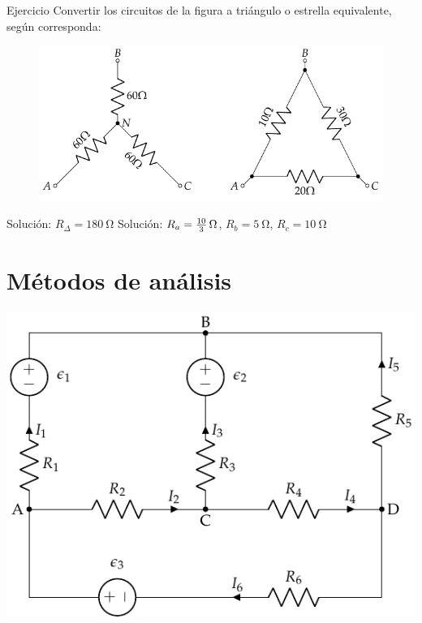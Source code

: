 \documentclass[aspectratio=169, xcolor={usenames,svgnames,dvipsnames}]{beamer}
\begin{document}

\begin{frame}{Ejercicio}
    \vspace{3mm}
    Convertir los circuitos de la figura a triángulo o estrella equivalente, según corresponda:
     \begin{figure}[H]
     	\centering
        \includegraphics{../figs/ej7_BT1.pdf}
     \end{figure}

    \vspace{5mm}
    \small{\hspace{29mm}\alert{Solución}: $R_{\Delta} = \qty{180}{\ohm}$ 
    \hspace{10mm}
    \alert{Solución}: $R_a = \frac{10}{3} \, \ohm$, $R_b = \qty{5}{\ohm}$, $R_c = \qty{10}{\ohm}$} 
\end{frame}


\section{Métodos de análisis}

\begin{frame}
    \begin{center}
    \includegraphics[height=0.95\textheight]{../figs/mallas1.pdf}
    \end{center}
\end{frame}
\end{document}
